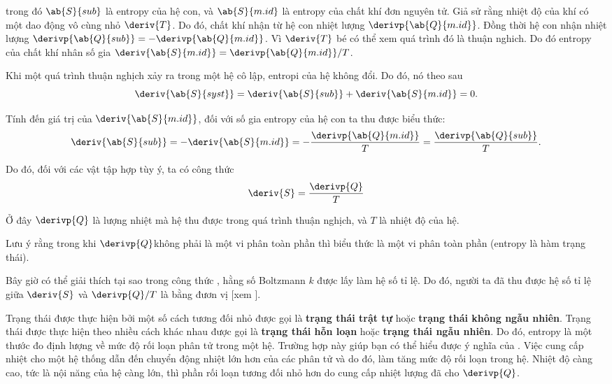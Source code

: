 \noindent
trong đó $\ab{S}{sub}$ là entropy của hệ con, và $\ab{S}{m. id}$ là entropy của chất khí đơn nguyên tử. Giả sử rằng nhiệt độ của khí có một dao động vô cùng nhỏ $\deriv{T}$. Do đó, chất khí nhận từ hệ con nhiệt lượng $\derivp{\ab{Q}{m. id}}$. Đồng thời hệ con nhận nhiệt lượng $\derivp{\ab{Q}{sub}}=-\derivp{\ab{Q}{m. id}}$. Vì $\deriv{T}$ bé có thể xem quá trình đó là thuận nghich. Do đó entropy của chất khí nhân số gia $\deriv{\ab{S}{m. id}}=\derivp{\ab{Q}{m. id}}/T$.

Khi một quá trình thuận nghịch xảy ra trong một hệ cô lập, entropi của hệ không đổi. Do đó, nó theo sau 
\begin{equation*}
	\deriv{\ab{S}{syst}} = \deriv{\ab{S}{sub}} + \deriv{\ab{S}{m. id}} = 0.
\end{equation*}

\noindent
Tính đến giá trị của $\deriv{\ab{S}{m. id}}$, đối với số gia entropy của hệ con ta thu được biểu thức:
\begin{equation*}
	\deriv{\ab{S}{sub}} = -\deriv{\ab{S}{m. id}} = -\frac{\derivp{\ab{Q}{m. id}}}{T} = \frac{\derivp{\ab{Q}{sub}}}{T}.
\end{equation*}

\noindent
Do đó, đối với các vật tập hợp tùy ý, ta có công thức
\begin{equation}\label{eq:11_110}
	\deriv{S} = \frac{\derivp{Q}}{T}
\end{equation}

\noindent
Ở đây $\derivp{Q}$ là lượng nhiệt mà hệ thu được trong quá trình thuận nghịch, và $T$ là nhiệt độ của hệ.

Lưu ý rằng trong khi $\derivp{Q}$không phải là một vi phân toàn phần thì biểu thức  là một vi phân toàn phần (entropy là hàm trạng thái).

Bây giờ có thể giải thích tại sao trong công thức , hằng số Boltzmann $k$ được lấy làm hệ số tỉ lệ. Do đó, người ta đã thu được hệ số tỉ lệ giữa $\deriv{S}$ và $\derivp{Q}/T$ là bằng đươn vị [xem ].

Trạng thái được thực hiện bởi một số cách tương đối nhỏ được gọi là \textbf{trạng thái trật tự} hoặc \textbf{trạng thái không ngẫu nhiên}. Trạng thái được thực hiện theo nhiều cách khác nhau được gọi là \textbf{trạng thái hỗn loạn} hoặc \textbf {trạng thái ngẫu nhiên}. Do đó, entropy là một thước đo định lượng về mức độ rối loạn phân tử trong một hệ. Trường hợp này giúp bạn có thể hiểu được ý nghĩa của . Việc cung cấp nhiệt cho một hệ thống dẫn đến chuyển động nhiệt lớn hơn của các phân tử và do đó, làm tăng mức độ rối loạn trong hệ. Nhiệt độ càng cao, tức là nội năng của hệ càng lớn, thì phần rối loạn tương đối nhỏ hơn do cung cấp nhiệt lượng đã cho $\derivp{Q}$.


